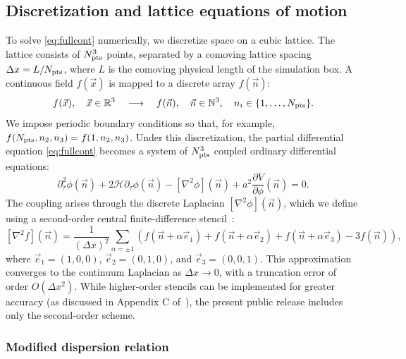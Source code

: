 \documentclass[aps, nofootinbib,superscriptaddress, preprintnumbers, longbibliography]{article}
\begin{document}
\subsection{Discretization and lattice equations of motion}
\label{sec:discrete}

To solve \cref{eq:fullcont} numerically, we discretize space on a cubic lattice. The lattice consists of $N_{\rm pts}^3$ points, separated by a comoving lattice spacing $\Delta x = L / N_{\rm pts}$, where $L$ is the comoving physical length of the simulation box. A continuous field $f(\vec{x})$ is mapped to a discrete array $f(\vec{n})$:
\begin{equation}
\label{eq:discretization}
f(\vec{x}), \quad \vec{x} \in \mathbb{R}^3 \quad\longrightarrow\quad f(\vec{n}), \quad \vec{n} \in \mathbb{N}^3,\quad n_i \in \{1, \dots, N_{\rm pts}\}.
\end{equation}
We impose periodic boundary conditions so that, for example, $f(N_{\rm pts}, n_2, n_3) = f(1, n_2, n_3)$. Under this discretization, the partial differential equation \cref{eq:fullcont} becomes a system of $N_{\rm pts}^3$ coupled ordinary differential equations:
\begin{equation}
\label{eq:disc}
\partial_\tau^2 \phi(\vec{n}) + 2\mathcal{H}\partial_\tau \phi(\vec{n}) - [\nabla^2 \phi](\vec{n}) + a^2 \frac{\partial V}{\partial \phi}(\vec{n}) = 0.
\end{equation}
The coupling arises through the discrete Laplacian $[\nabla^2 \phi](\vec{n})$, which we define using a second-order central finite-difference stencil~\cite{press1986numerical}:
\begin{equation}
\label{eq:discretelaplacian}
[\nabla^2 f](\vec{n}) = \frac{1}{(\Delta x)^2} \sum_{\alpha = \pm 1} \left(
f(\vec{n} + \alpha \vec{e}_1) + f(\vec{n} + \alpha \vec{e}_2) + f(\vec{n} + \alpha \vec{e}_3) - 3f(\vec{n})
\right),
\end{equation}
where $\vec{e}_1 = (1, 0, 0)$, $\vec{e}_2 = (0, 1, 0)$, and $\vec{e}_3 = (0, 0, 1)$. This approximation converges to the continuum Laplacian as $\Delta x \rightarrow 0$, with a truncation error of order $O(\Delta x^2)$. While higher-order stencils can be implemented for greater accuracy (as discussed in Appendix C of~\cite{Caravano:2021pgc}), the present public release includes only the second-order scheme.

\subsubsection{Modified dispersion relation}
\label{sec:modified}
\end{document}
